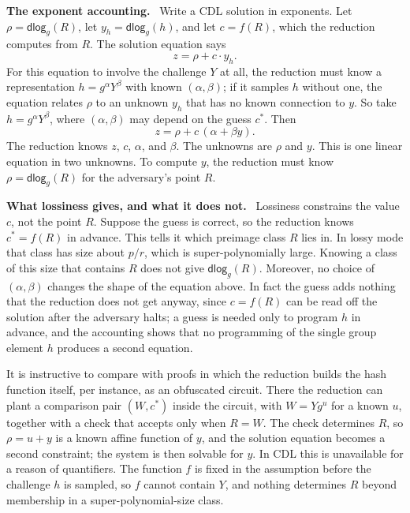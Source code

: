 \documentclass[11pt]{article}
\newcommand{\dlog}{\mathsf{dlog}}
\newcommand{\heading}[1]{\medskip\noindent\textbf{#1}\ }
\begin{document}
\heading{The exponent accounting.}
Write a CDL solution in exponents. Let $\rho = \dlog_g(R)$, let $y_h = \dlog_g(h)$, and let $c = f(R)$, which the reduction computes from $R$. The solution equation says
$$z = \rho + c \cdot y_h.$$
For this equation to involve the challenge $Y$ at all, the reduction must know a representation $h = g^{\alpha} Y^{\beta}$ with known $(\alpha,\beta)$; if it samples $h$ without one, the equation relates $\rho$ to an unknown $y_h$ that has no known connection to $y$. So take $h = g^{\alpha}Y^{\beta}$, where $(\alpha, \beta)$ may depend on the guess $c^\ast$. Then
$$z = \rho + c\,(\alpha + \beta y).$$
The reduction knows $z$, $c$, $\alpha$, and $\beta$. The unknowns are $\rho$ and $y$. This is one linear equation in two unknowns. To compute $y$, the reduction must know $\rho = \dlog_g(R)$ for the adversary's point $R$.

\heading{What lossiness gives, and what it does not.}
Lossiness constrains the value $c$, not the point $R$. Suppose the guess is correct, so the reduction knows $c^\ast = f(R)$ in advance. This tells it which preimage class $R$ lies in. In lossy mode that class has size about $p/r$, which is super-polynomially large. Knowing a class of this size that contains $R$ does not give $\dlog_g(R)$. Moreover, no choice of $(\alpha,\beta)$ changes the shape of the equation above. In fact the guess adds nothing that the reduction does not get anyway, since $c = f(R)$ can be read off the solution after the adversary halts; a guess is needed only to program $h$ in advance, and the accounting shows that no programming of the single group element $h$ produces a second equation.

It is instructive to compare with proofs in which the reduction builds the hash function itself, per instance, as an obfuscated circuit. There the reduction can plant a comparison pair $(W, c^\ast)$ inside the circuit, with $W = Y g^{u}$ for a known $u$, together with a check that accepts only when $R = W$. The check determines $R$, so $\rho = u + y$ is a known affine function of $y$, and the solution equation becomes a second constraint; the system is then solvable for $y$. In CDL this is unavailable for a reason of quantifiers. The function $f$ is fixed in the assumption before the challenge $h$ is sampled, so $f$ cannot contain $Y$, and nothing determines $R$ beyond membership in a super-polynomial-size class.
\end{document}
